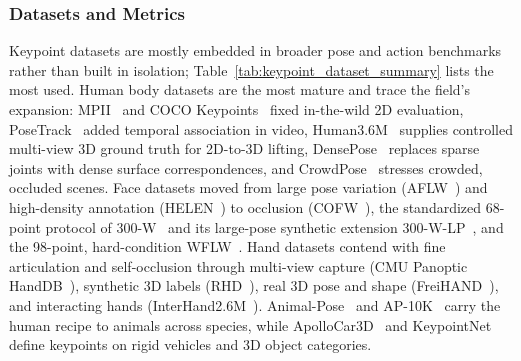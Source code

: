 \subsubsection{Datasets and Metrics}
Keypoint datasets are mostly embedded in broader pose and action benchmarks rather than built in isolation; Table~\ref{tab:keypoint_dataset_summary} lists the most used.
Human body datasets are the most mature and trace the field's expansion: MPII~\cite{andriluka20142d} and COCO Keypoints~\cite{lin2014microsoft} fixed in-the-wild 2D evaluation, PoseTrack~\cite{andriluka2018posetrack} added temporal association in video, Human3.6M~\cite{IonescuPOS14} supplies controlled multi-view 3D ground truth for 2D-to-3D lifting, DensePose~\cite{guler2018densepose} replaces sparse joints with dense surface correspondences, and CrowdPose~\cite{li2019crowdpose} stresses crowded, occluded scenes.
Face datasets moved from large pose variation (AFLW~\cite{koestinger2011annotated}) and high-density annotation (HELEN~\cite{le2012interactive}) to occlusion (COFW~\cite{burgos2013robust}), the standardized 68-point protocol of 300-W~\cite{sagonas2013300} and its large-pose synthetic extension 300-W-LP~\cite{zhu2016face}, and the 98-point, hard-condition WFLW~\cite{wu2018look}.
Hand datasets contend with fine articulation and self-occlusion through multi-view capture (CMU Panoptic HandDB~\cite{simon2017hand}), synthetic 3D labels (RHD~\cite{zimmermann2017learning}), real 3D pose and shape (FreiHAND~\cite{zimmermann2019freihand}), and interacting hands (InterHand2.6M~\cite{moon2020interhand2}).
Animal-Pose~\cite{cao2019cross} and AP-10K~\cite{yu2021ap} carry the human recipe to animals across species, while ApolloCar3D~\cite{song2019apollocar3d} and KeypointNet~\cite{you2020keypointnet} define keypoints on rigid vehicles and 3D object categories.

